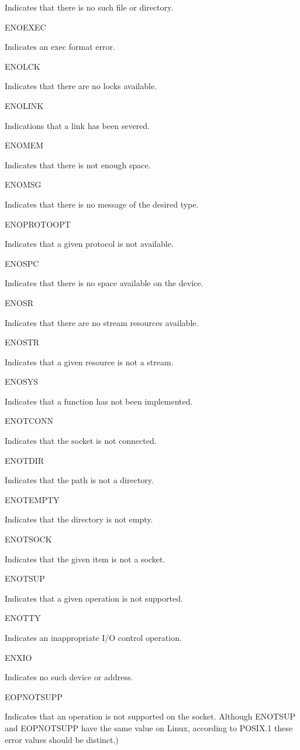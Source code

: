 Indicates that there is no such file or directory.

ENOEXEC

Indicates an exec format error.

ENOLCK

Indicates that there are no locks available.

ENOLINK

Indications that a link has been severed.

ENOMEM

Indicates that there is not enough space.

ENOMSG

Indicates that there is no message of the desired type.

ENOPROTOOPT

Indicates that a given protocol is not available.

ENOSPC

Indicates that there is no space available on the device.

ENOSR

Indicates that there are no stream resources available.

ENOSTR

Indicates that a given resource is not a stream.

ENOSYS

Indicates that a function has not been implemented.

ENOTCONN

Indicates that the socket is not connected.

ENOTDIR

Indicates that the path is not a directory.

ENOTEMPTY

Indicates that the directory is not empty.

ENOTSOCK

Indicates that the given item is not a socket.

ENOTSUP

Indicates that a given operation is not supported.

ENOTTY

Indicates an inappropriate I/O control operation.

ENXIO

Indicates no such device or address.

EOPNOTSUPP

Indicates that an operation is not supported on the socket. Although
ENOTSUP and EOPNOTSUPP have the same value on Linux, according to
POSIX.1 these error values should be distinct.)

